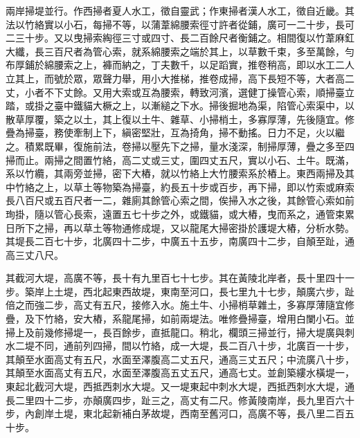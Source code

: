 \begin{pinyinscope}
 兩岸掃堤並行。作西掃者夏人水工，徵自靈武；作東掃者漢人水工，徵自近畿。其法以竹絡實以小石，每掃不等，以蒲葦綿腰索徑寸許者從鋪，廣可一二十步，長可二三十步。又以曳掃索綯徑三寸或四寸、長二百餘尺者衡鋪之。相間復以竹葦麻釭大纖，長三百尺者為管心索，就系綿腰索之端於其上，以草數千束，多至萬餘，勻布厚鋪於綿腰索之上，褲而納之，丁夫數千，以足蹈實，推卷稍高，即以水工二人立其上，而號於眾，眾聲力舉，用小大推梯，推卷成掃，高下長短不等，大者高二丈，小者不下丈餘。又用大索或互為腰索，轉致河濱，選健丁操管心索，順掃臺立踏，或掛之臺中鐵貓大橛之上，以漸縋之下水。掃後掘地為渠，陷管心索渠中，以散草厚覆，築之以土，其上復以土牛、雜草、小掃梢土，多寡厚薄，先後隨宜。修疊為掃臺，務使牽制上下，縝密堅壯，互為掎角，掃不動搖。日力不足，火以繼之。積累既畢，復施前法，卷掃以壓先下之掃，量水淺深，制掃厚薄，疊之多至四掃而止。兩掃之間置竹絡，高二丈或三丈，圍四丈五尺，實以小石、土牛。既滿，系以竹纜，其兩旁並掃，密下大樁，就以竹絡上大竹腰索系於樁上。東西兩掃及其中竹絡之上，以草土等物築為掃臺，約長五十步或百步，再下掃，即以竹索或麻索長八百尺或五百尺者一二，雜廁其餘管心索之間，俟掃入水之後，其餘管心索如前珣掛，隨以管心長索，遠置五七十步之外，或鐵貓，或大樁，曳而系之，通管束累日所下之掃，再以草土等物通修成堤，又以龍尾大掃密掛於護堤大樁，分析水勢。其堤長二百七十步，北廣四十二步，中廣五十五步，南廣四十二步，自顛至趾，通高三丈八尺。



 其截河大堤，高廣不等，長十有九里百七十七步。其在黃陵北岸者，長十里四十一步。築岸上土堤，西北起東西故堤，東南至河口，長七里九十七步，顛廣六步，趾倍之而強二步，高丈有五尺，接修入水。施土牛、小掃梢草雜土，多寡厚薄隨宜修疊，及下竹絡，安大樁，系龍尾掃，如前兩堤法。唯修疊掃臺，增用白闌小石。並掃上及前幾修掃堤一，長百餘步，直抵龍口。稍北，欄頭三掃並行，掃大堤廣與刺水二堤不同，通前列四掃，間以竹絡，成一大堤，長二百八十步，北廣百一十步，其顛至水面高丈有五尺，水面至澤腹高二丈五尺，通高三丈五尺；中流廣八十步，其顛至水面高丈有五尺，水面至澤腹高五丈五尺，通高七丈。並創築縷水橫堤一，東起北截河大堤，西抵西刺水大堤。又一堤東起中刺水大堤，西抵西刺水大堤，通長二里四十二步，亦顛廣四步，趾三之，高丈有二尺。修黃陵南岸，長九里百六十步，內創岸土堤，東北起新補白茅故堤，西南至舊河口，高廣不等，長八里二百五十步。




\end{pinyinscope}
